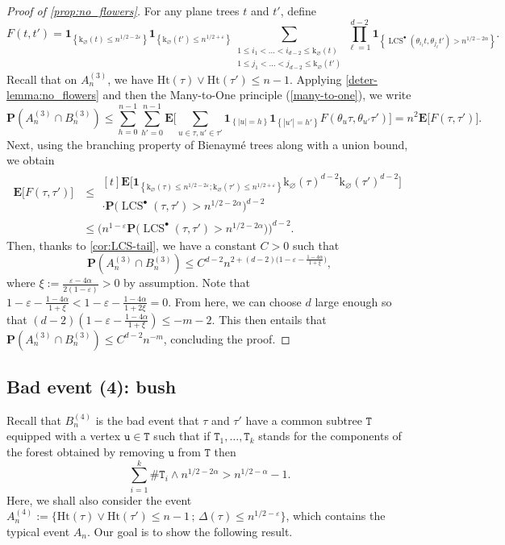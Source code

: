 \documentclass[11pt,reqno]{amsart}
\newcommand{\1}{\mathbf{1}}
\newcommand{\0}{\mathbf{0}}
\newcommand{\ttT}{\mathtt{T}}
\newcommand{\ttu}{\mathtt{u}}
\newcommand{\E}{{\mathbf E}}
\newcommand{\I}[1]{{\mathbf 1}_{\left\{#1\right\}}}
\newcommand{\prob}{\mathbf{P}}
\newcommand{\Ht}{\mathrm{Ht}}
\newcommand{\rk}{\mathrm{k}}
\newcommand{\LCS}{\operatorname{LCS}}
\renewcommand{\emptyset}{\varnothing}
\begin{document}
\begin{proof}[Proof of \cref{prop:no_flowers}]
For any plane trees $t$ and $t'$, define
\[F(t,t')=\I{\rk_\varnothing(t)\leq n^{1/2-2\varepsilon}}\I{\rk_\varnothing(t')\leq n^{1/2+\varepsilon}} \sum_{\substack{1 \leq i_1 < \ldots < i_{d-2} \leq \rk_\emptyset(t) \\ 1 \leq j_1 < \ldots < j_{d-2} \leq \rk_\emptyset(t')}}\prod_{\ell=1}^{d-2} \I{\LCS^\bullet(\theta_{i_\ell}t , \theta_{j_\ell}t') > n^{1/2-2\alpha}}.\]
Recall that on $A_n^{(3)}$, we have $\Ht(\tau)\vee \Ht(\tau')\leq n-1$. Applying \cref{deter-lemma:no_flowers} and then the Many-to-One principle (\cref{many-to-one}), we write
\[
\prob(A_n^{(3)} \cap B_n^{(3)})\leq \sum_{h=0}^{n-1} \sum_{h'=0}^{n-1} \E\bigg[\sum_{u\in\tau,u'\in\tau'}\I{|u|=h}\I{|u'|=h'} F(\theta_u \tau,\theta_{u'}\tau')\bigg]=n^2\E\big[F(\tau,\tau')\big].
\]
Next, using the branching property of Bienaymé trees along with a union bound, we obtain
\begin{align*}
\E\big[F(\tau,\tau')\big] &\leq
    \begin{multlined}[t]
    \E\Big[\I{\rk_\varnothing(\tau)\leq n^{1/2-2\varepsilon};\rk_\varnothing(\tau')\leq n^{1/2+\varepsilon}}\rk_\varnothing(\tau)^{d-2}\rk_\varnothing(\tau')^{d-2}\Big]\\
    \cdot \prob\big(\LCS^\bullet(\tau,\tau')>n^{1/2-2\alpha}\big)^{d-2}
    \end{multlined}\\
&\leq \Big(n^{1-\varepsilon}\prob\big(\LCS^\bullet(\tau,\tau')>n^{1/2-2\alpha}\big)\Big)^{d-2}.
\end{align*}
Then, thanks to \cref{cor:LCS-tail}, we have a constant $C > 0$ such that
\[\prob(A_n^{(3)}\cap B_n^{(3)}) \leq C^{d-2}n^{2+(d-2)\big(1-\varepsilon - \frac{1-4\alpha}{1+\xi}\big)},\]
where $\xi:=\frac{\varepsilon-4\alpha}{2(1-\varepsilon)}>0$ by assumption. Note that $1-\varepsilon-\frac{1-4\alpha}{1+\xi}<1-\varepsilon-\frac{1-4\alpha}{1+2\xi}=0$. From here, we can choose $d$ large enough so that $(d-2)(1-\varepsilon - \frac{1-4\alpha}{1+\xi})\leq -m-2$. This then entails that $\prob(A_n^{(3)}\cap B_n^{(3)}) \leq C^{d-2}n^{-m}$, concluding the proof.
\end{proof}

\subsection{Bad event (4): bush}
Recall that $B_n^{(4)}$ is the bad event that $\tau$ and $\tau'$ have a common subtree $\ttT$ equipped with a vertex $\ttu\in\ttT$ such that if $\ttT_1,\ldots,\ttT_k$ stands for the components of the forest obtained by removing $\ttu$ from $\ttT$ then
\[\sum_{i=1}^k \#\ttT_i\wedge n^{1/2-2\alpha} > n^{1/2-\alpha}-1.\]
Here, we shall also consider the event $A_n^{(4)}:=\big\{\Ht(\tau)\vee\Ht(\tau')\leq n-1 \,;\, \Delta(\tau)\leq n^{1/2-\varepsilon}\big\}$, which contains the typical event $A_n$. Our goal is to show the following result.
\end{document}
